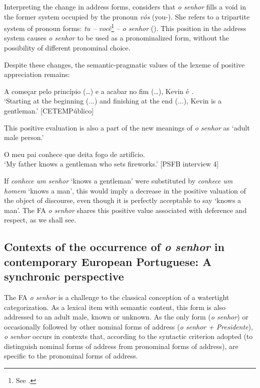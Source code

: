\documentclass[output=paper]{langscibook}
\begin{document}
Interpreting the change in address forms, \citet[370]{Biderman1972} considers that \textit{o senhor} fills a void in the former system occupied by the pronoun \textit{vós} (you-). She refers to a tripartite system of pronoun forms: \textit{tu – você}\footnote{See \citet{NascimentoMendesDuarte2018}.} – \textit{o senhor} (\citealt[373]{Biderman1972}). This position in the address system causes \textit{o senhor} to be used as a pronominalized form, without the possibility of different pronominal choice.



Despite these changes, the semantic-pragmatic values of the lexeme of positive appreciation remains:

\ea\label{ex:marques:16}
A começar pelo princípio (…) e a acabar no fim (…), Kevin é .\\
\glt ‘Starting at the beginning (...) and finishing at the end (...), Kevin is a gentleman.’ [CETEMPúblico] \\
\z 

This positive evaluation is also a part of the new meanings of \textit{o senhor} as ‘adult male person.’

\ea\label{ex:marques:17}
O meu pai conhece  que deita fogo de artifício.\\
\glt ‘My father knows a gentleman who sets fireworks.’ [PSFB interview 4]\\
\z 

If \textit{conhece um senhor} ‘knows a gentleman’ were substituted by \textit{conhece um homem}  ‘knows a man’, this would imply a decrease in the positive valuation of the object of discourse, even though it is perfectly acceptable to say ‘knows a man’. The FA \textit{o senhor} shares this positive value associated with deference and respect, as we shall see.  


\subsection{Contexts of the occurrence of \textit{o senhor} in contemporary European Portuguese: A synchronic perspective}\label{sec:marques:4.2}

The FA \textit{o senhor} is a challenge to the classical conception of a watertight categorization. As a lexical item with semantic content, this form is also addressed to an adult male, known or unknown. As the only form (\textit{o senhor}) or occasionally followed by other nominal forms of address (\textit{o senhor + Presidente}), \textit{o senhor} occurs in contexts that, according to the syntactic criterion adopted (to distinguish nominal forms of address from pronominal forms of address), are specific to the pronominal forms of address.
\end{document}
